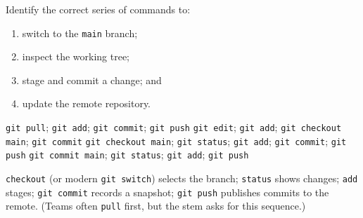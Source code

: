 \newpage


\question[4]
Identify the correct series of commands to:
\begin{enumerate}
  \item switch to the \texttt{main} branch;
  \item inspect the working tree;
  \item stage and commit a change; and
  \item update the remote repository.
\end{enumerate}
\begin{choices}
  \choice \texttt{git pull}; \texttt{git add}; \texttt{git commit}; \texttt{git push}
  \choice \texttt{git edit}; \texttt{git add}; \texttt{git checkout main}; \texttt{git commit}
  \CorrectChoice \texttt{git checkout main}; \texttt{git status}; \texttt{git add}; \texttt{git commit}; \texttt{git push}
  \choice \texttt{git commit main}; \texttt{git status}; \texttt{git add}; \texttt{git push}
\end{choices}
\begin{solution}
  \texttt{checkout} (or modern \texttt{git switch}) selects the branch; \texttt{status} shows changes; \texttt{add} stages; \texttt{git commit} records a snapshot; \texttt{git push} publishes commits to the remote. (Teams often \texttt{pull} first, but the stem asks for this sequence.)
\end{solution}

